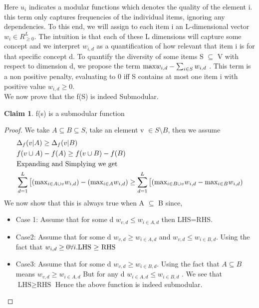 \documentclass[a4paper,twoside]{iiththesis}
\theoremstyle{definition}
\theoremstyle{definition}
\newtheorem{claim}{Claim}[section]
\theoremstyle{remark}
\begin{document}
Here $u_i$ indicates a modular functions which denotes the quality of the element i.
this term only captures frequencies of the individual items, ignoring any dependencies. To this end, we will assign to each item i an L-dimensional vector $w_i \in R^L_{ \geq 0} $. The intuition is that each of these L dimensions will capture
some concept  and we interpret $w_{i,d}$ as a quantification of how relevant that
item i is for that specific concept d. To quantify the diversity of some items S $\subseteq$ V with respect to dimension d, we propose the term $\text{max}\space w_{i, d} - \sum_{i \in S} w_{i, d}$ . This
term is a non positive penalty, evaluating to 0 iff S contains at most one item i with positive value $w_{i,d} \geq 0$.  \\
We now prove that the f(S) is indeed Submodular.
\theoremstyle{claim} 
\begin{claim}
f(s) is a submodular function
\end{claim}
\begin{proof}
We take $A\subseteq B \subseteq S$, take an element v $\in S\setminus B$, then we assume 
\begin{align}
			& \Delta_f(v | A) \geq \Delta_f(v|B) \\
            & f(v \cup A) -f(A) \geq f(v \cup B) - f(B) \\
            & \text{Expanding and Simplying we get} \\
            &  \sum_{d=1}^L \big[(\text{max}_{i \in A \cup v} \space w_{i, d}) - (\text{max}_{i \in A} \space w_{i, d}) \geq  \sum_{d=1}^L \big[(\text{max}_{i \in B \cup v} \space w_{i, d} - \text{max}_{i \in B} \space w_{i, d})
\end{align}
We now show that this is always true when  A $\subseteq$ B since, 
\begin{itemize}
\item  Case 1: Assume that for some d $w_{v, d} \leq w_{i\in A, d}$ then LHS=RHS.
\item Case2: Assume that for some d $w_{v, d} \ge w_{i\in A, d}$ and $w_{v, d} \leq w_{i\in B, d}$. Using the fact that $w_{i, d} \geq 0 \forall{i}.\\ \text{LHS $\geq$ RHS}$
\item Case3:  Assume that for some d $w_{v, d} \geq w_{i\in B, d}$. Using the fact that $A \subseteq B$ means 
$w_{v, d} \geq w_{i\in A, d}$ But for any d $w_{i\in A, d} \leq w_{i \in B, d}$ . We see that $\text{LHS} \geq \text{RHS}$
Hence the above function is indeed submodular.
\end{itemize}
\end{proof}
\end{document}
